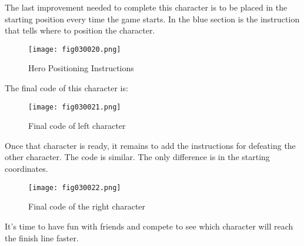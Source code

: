 The last improvement needed to complete this character is to be placed in the starting position every time the game starts. In the blue section is the instruction that tells where to position the character.

\begin{figure}[H]
   \centering
   \texttt{[image: fig030020.png]}
   \caption{Hero Positioning Instructions}
\label{fig030020}
\end{figure}

The final code of this character is:

\begin{figure}[H]
   \centering
   \texttt{[image: fig030021.png]}
   \caption{Final code of left character}
\label{fig030021}
\end{figure}

Once that character is ready, it remains to add the instructions for defeating the other character. The code is similar. The only difference is in the starting coordinates.

\begin{figure}[H]
   \centering
   \texttt{[image: fig030022.png]}
   \caption{Final code of the right character}
\label{fig030022}
\end{figure}

It's time to have fun with friends and compete to see which character will reach the finish line faster.
